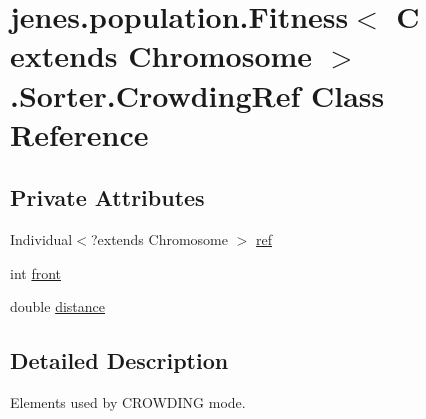 \hypertarget{classjenes_1_1population_1_1_fitness_3_01_c_01extends_01_chromosome_01_4_1_1_sorter_1_1_crowding_ref}{\section{jenes.\-population.\-Fitness$<$ C extends Chromosome $>$.Sorter.\-Crowding\-Ref Class Reference}
\label{classjenes_1_1population_1_1_fitness_3_01_c_01extends_01_chromosome_01_4_1_1_sorter_1_1_crowding_ref}
}
\subsection*{Private Attributes}
\begin{DoxyCompactItemize}
\item 
Individual$<$?extends Chromosome $>$ \hyperlink{classjenes_1_1population_1_1_fitness_3_01_c_01extends_01_chromosome_01_4_1_1_sorter_1_1_crowding_ref_af8a2da66d7ba48d280c26d5c38b9ef14}{ref}
\item 
int \hyperlink{classjenes_1_1population_1_1_fitness_3_01_c_01extends_01_chromosome_01_4_1_1_sorter_1_1_crowding_ref_a68db3ef034534402446f55b2e3ea1652}{front}
\item 
double \hyperlink{classjenes_1_1population_1_1_fitness_3_01_c_01extends_01_chromosome_01_4_1_1_sorter_1_1_crowding_ref_a4c5448dda1bbda6d3f620512fc9bd3e2}{distance}
\end{DoxyCompactItemize}


\subsection{Detailed Description}
Elements used by C\-R\-O\-W\-D\-I\-N\-G mode. 

